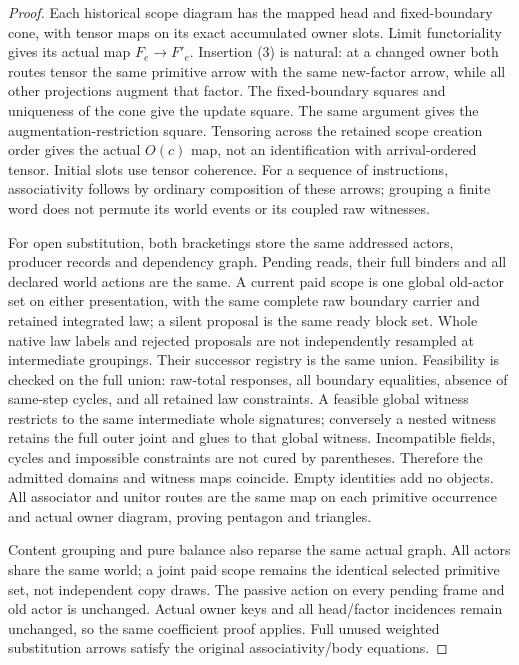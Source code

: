 \documentclass[11pt]{article}\usepackage{amsmath,amssymb,amsthm}
\begin{document}
\begin{proof}
Each historical scope diagram has the mapped head and fixed-boundary cone, with tensor maps on its exact accumulated owner slots. Limit functoriality gives its actual map $F_e\to F'_e$. Insertion (3) is natural: at a changed owner both routes tensor the same primitive arrow with the same new-factor arrow, while all other projections augment that factor. The fixed-boundary squares and uniqueness of the cone give the update square. The same argument gives the augmentation-restriction square. Tensoring across the retained scope creation order gives the actual $O(c)$ map, not an identification with arrival-ordered tensor. Initial slots use tensor coherence. For a sequence of instructions, associativity follows by ordinary composition of these arrows; grouping a finite word does not permute its world events or its coupled raw witnesses.

For open substitution, both bracketings store the same addressed actors, producer records and dependency graph. Pending reads, their full binders and all declared world actions are the same. A current paid scope is one global old-actor set on either presentation, with the same complete raw boundary carrier and retained integrated law; a silent proposal is the same ready block set. Whole native law labels and rejected proposals are not independently resampled at intermediate groupings. Their successor registry is the same union. Feasibility is checked on the full union: raw-total responses, all boundary equalities, absence of same-step cycles, and all retained law constraints. A feasible global witness restricts to the same intermediate whole signatures; conversely a nested witness retains the full outer joint and glues to that global witness. Incompatible fields, cycles and impossible constraints are not cured by parentheses. Therefore the admitted domains and witness maps coincide. Empty identities add no objects. All associator and unitor routes are the same map on each primitive occurrence and actual owner diagram, proving pentagon and triangles.

Content grouping and pure balance also reparse the same actual graph. All actors share the same world; a joint paid scope remains the identical selected primitive set, not independent copy draws. The passive action on every pending frame and old actor is unchanged. Actual owner keys and all head/factor incidences remain unchanged, so the same coefficient proof applies. Full unused weighted substitution arrows satisfy the original associativity/body equations.


\end{proof}
\end{document}
